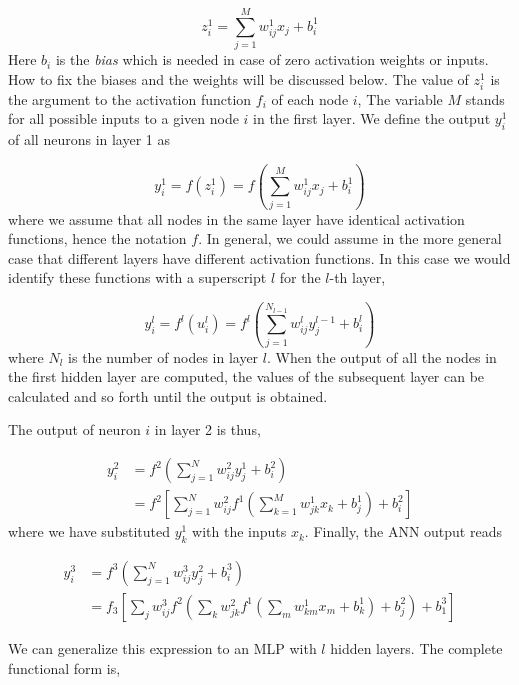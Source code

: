 \begin{equation} 
	z_i^1 = \sum_{j=1}^{M} w_{ij}^1 x_j + b_i^1
\end{equation}
Here $b_i$ is the \textit{bias} which is needed in
case of zero activation weights or inputs. How to fix the biases and
the weights will be discussed below.  The value of $z_i^1$ is the
argument to the activation function $f_i$ of each node $i$, The
variable $M$ stands for all possible inputs to a given node $i$ in the
first layer.  We define  the output $y_i^1$ of all neurons in layer 1 as

\begin{equation}\label{eq:output-layer}
	y_i^1 = f(z_i^1) = f\left(\sum_{j=1}^M w_{ij}^1 x_j  + b_i^1\right)
\end{equation}
where we assume that all nodes in the same layer have identical
activation functions, hence the notation $f$. In general, we could assume in the more general case that different layers have different activation functions.
In this case we would identify these functions with a superscript $l$ for the $l$-th layer,

\begin{equation}\label{eq:general-layer}
	y_i^l = f^l(u_i^l) = f^l\left(\sum_{j=1}^{N_{l-1}} w_{ij}^l y_j^{l-1} + b_i^l\right)
\end{equation}
where $N_l$ is the number of nodes in layer $l$. When the output of
all the nodes in the first hidden layer are computed, the values of
the subsequent layer can be calculated and so forth until the output
is obtained.

The output of neuron $i$ in layer 2 is thus,

\begin{align}\label{eq:output-layer-2}
	y_i^2 &= f^2\left(\sum_{j=1}^N w_{ij}^2 y_j^1 + b_i^2\right) \\
	&= f^2\left[\sum_{j=1}^N w_{ij}^2f^1\left(\sum_{k=1}^M w_{jk}^1 x_k + b_j^1\right) + b_i^2\right]
\end{align}
where we have substituted $y_k^1$ with the inputs $x_k$. Finally, the ANN output reads

\begin{align}
	y_i^3 &= f^3\left(\sum_{j=1}^N w_{ij}^3 y_j^2 + b_i^3\right) \\
	&= f_3\left[\sum_{j} w_{ij}^3 f^2\left(\sum_{k} w_{jk}^2 f^1\left(\sum_{m} w_{km}^1 x_m + b_k^1\right) + b_j^2\right)
	+ b_1^3\right]
\end{align}

We can generalize this expression to an MLP with $l$ hidden
layers. The complete functional form is,

